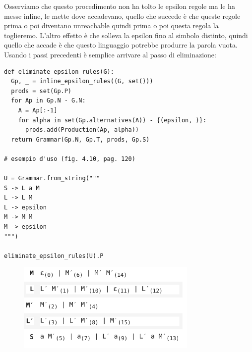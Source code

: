 Osserviamo che questo procedimento non ha tolto le epsilon regole ma le ha messe inline, le mette dove accadevano, quello che succede è che queste regole prima o poi diventano unreachable quindi prima o poi questa regola la toglieremo. L'altro effetto è che solleva la epsilon fino al simbolo distinto, quindi quello che accade è che questo linguaggio potrebbe produrre la parola vuota.
Usando i passi precedenti è semplice arrivare al passo di eliminazione:
\begin{lstlisting}
def eliminate_epsilon_rules(G):
  Gp, _ = inline_epsilon_rules((G, set()))
  prods = set(Gp.P)
  for Ap in Gp.N - G.N:
    A = Ap[:-1]
    for alpha in set(Gp.alternatives(A)) - {(epsilon, )}:
      prods.add(Production(Ap, alpha))
  return Grammar(Gp.N, Gp.T, prods, Gp.S)

# esempio d'uso (fig. 4.10, pag. 120)

U = Grammar.from_string("""
S -> L a M
L -> L M 
L -> epsilon
M -> M M
M -> epsilon
""")

eliminate_epsilon_rules(U).P
\end{lstlisting}

\begin{figure}[ht!]
  \centering
  \includegraphics[scale=1]{images/Parsing/esEliminateEpsilon.png}
\end{figure}

